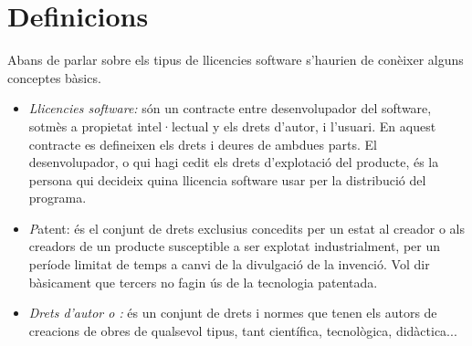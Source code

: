 \section{Definicions}
Abans de parlar sobre els tipus de llicencies software s'haurien de conèixer alguns conceptes bàsics.
\begin {itemize}
\item \emph{Llicencies software:} són un contracte entre desenvolupador del software, sotmès a propietat intel·lectual y els drets d'autor, i l'usuari. En aquest contracte es defineixen els drets i deures de ambdues parts. El desenvolupador, o qui hagi cedit els drets d'explotació del producte, és la persona qui decideix quina llicencia software usar per la distribució del programa.
\item \emph Patent: és el conjunt de drets exclusius concedits per un estat al creador o als creadors de un producte susceptible a ser explotat industrialment, per un període limitat de temps a canvi de la divulgació de la invenció. Vol dir bàsicament que tercers no fagin ús de la tecnologia patentada.
\item \emph{Drets d'autor o :} és un conjunt de drets i normes que tenen els autors de creacions de obres de qualsevol tipus, tant científica, tecnològica, didàctica...
\end {itemize}

